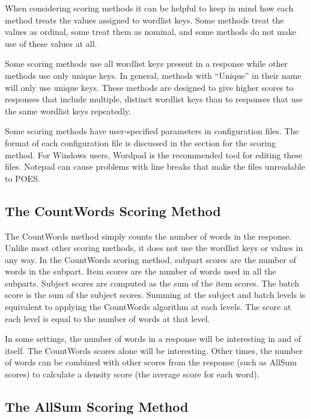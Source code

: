 \documentclass[11pt]{article}
\numberwithin{figure}{section}
\numberwithin{table}{section}
\begin{document}
When considering scoring methods it can be helpful to keep in mind how each method treats the values assigned to wordlist keys.  Some methods treat the values as ordinal, some treat them as nominal, and some methods do not make use of these values at all.   

Some scoring methods use all wordlist keys present in a response while other methods use only unique keys.  In general, methods with ``Unique'' in their name will only use unique keys.  These methods are designed to give higher scores to responses that include multiple, distinct wordlist keys than to responses that use the same wordlist keys repeatedly.

Some scoring methods have user-specified parameters in configuration files.  The format of each configuration file is discussed in the section for the scoring method.  For Windows users, Wordpad is the recommended tool for editing these files.  Notepad can cause problems with line breaks that make the files unreadable to POES.

\subsection{The CountWords Scoring Method}

The CountWords method simply counts the number of words in the response.  Unlike most other scoring methods, it does not use the wordlist keys or values in any way. 
In the CountWords scoring method, subpart scores are the number of words in the subpart.  Item scores are the number of words used in all the subparts.  Subject scores are computed as the sum of the item scores.  The batch score is the sum of the subject scores.  Summing at the subject and batch levels is equivalent to applying the CountWords algorithm at each levels.  The score at each level is equal to the number of words at that level. 

In some settings, the number of words in a response will be interesting in and of itself.  The CountWords scores alone will be interesting.  Other times, the number of words can be combined with other scores from the response (such as AllSum scores) to calculate a density score (the average score for each word).


\subsection{The AllSum Scoring Method}
\end{document}
